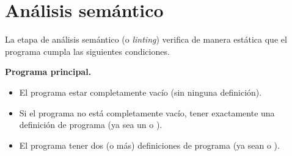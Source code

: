 \documentclass{article}
\begin{document}


\section{An\'alisis sem\'antico}

La etapa de an\'alisis sem\'antico (o {\em linting}) verifica de manera est\'atica que el programa cumpla las siguientes condiciones.
\bigskip

{\bf Programa principal.}
\begin{itemize}
\item El programa \PUEDE estar completamente vac\'io (sin ninguna definici\'on).
\item Si el programa no est\'a completamente vac\'io, \DEBE tener exactamente una definici\'on de programa
      (ya sea un  o ).
\item El programa \NOPUEDE tener dos (o m\'as) definiciones de programa
      (ya sean  o ).
\end{itemize}
\end{document}
